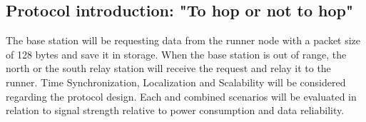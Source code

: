 \subsection{Protocol introduction: "To hop or not to hop"}\label{sc:protocolIntroduction}
The base station will be requesting data from the runner node with a packet size of 128 bytes and save it in storage. When the base station is out of range, the north or the south relay station will receive the request and relay it to the runner. Time Synchronization, Localization and Scalability will be considered regarding the protocol design. Each and combined scenarios will be evaluated in relation to signal strength relative to power consumption and data reliability.
